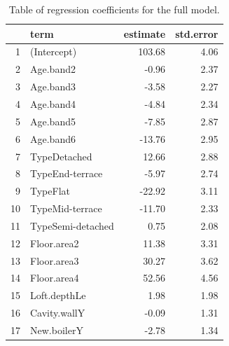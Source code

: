 \documentclass[9pt]{extarticle}
\begin{document}
\begin{table}[ht]
	\centering
	\begin{tabular}{rlrr}
		\hline
		& term & estimate & std.error \\ 
		\hline
		1 & (Intercept) & 103.68 & 4.06 \\ 
		2 & Age.band2 & -0.96 & 2.37 \\ 
		3 & Age.band3 & -3.58 & 2.27 \\ 
		4 & Age.band4 & -4.84 & 2.34 \\ 
		5 & Age.band5 & -7.85 & 2.87 \\ 
		6 & Age.band6 & -13.76 & 2.95 \\ 
		7 & TypeDetached & 12.66 & 2.88 \\ 
		8 & TypeEnd-terrace & -5.97 & 2.74 \\ 
		9 & TypeFlat & -22.92 & 3.11 \\ 
		10 & TypeMid-terrace & -11.70 & 2.33 \\ 
		11 & TypeSemi-detached & 0.75 & 2.08 \\ 
		12 & Floor.area2 & 11.38 & 3.31 \\ 
		13 & Floor.area3 & 30.27 & 3.62 \\ 
		14 & Floor.area4 & 52.56 & 4.56 \\ 
		15 & Loft.depthLe & 1.98 & 1.98 \\ 
		16 & Cavity.wallY & -0.09 & 1.31 \\ 
		17 & New.boilerY & -2.78 & 1.34 \\ 
		\hline
	\end{tabular}
\caption{Table of regression coefficients for the full model.}
\label{tab:fulmo}
\end{table}
\end{document}
